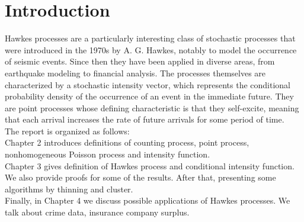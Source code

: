 \chapter{Introduction}
Hawkes processes are a particularly interesting class of stochastic processes that
were introduced in the 1970s by A. G. Hawkes, notably to model the occurrence of seismic events. Since then they have been applied in diverse areas, from earthquake modeling to financial analysis. The processes themselves are characterized by a stochastic intensity vector, which represents the conditional probability density
of the occurrence of an event in the immediate future. They are point processes whose
defining characteristic is that they self-excite, meaning that each arrival increases the
rate of future arrivals for some period of time.
\\
The report is organized as follows:
\\
Chapter 2 introduces definitions of counting process, point process, nonhomogeneous Poisson process and intensity function.
\\
Chapter 3 gives definition of Hawkes process and conditional intensity function. We also provide proofs for some of the results. After that, presenting some algorithms by thinning and cluster. 
\\
Finally, in Chapter 4 we discuss possible applications of Hawkes processes. We talk
about crime data, insurance company surplus.
